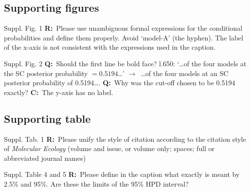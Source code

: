 \documentclass[11pt]{article}
\newenvironment{my_description}
{\begin{description}
  \setlength{\itemsep}{2pt}
  \setlength{\parskip}{0pt}
  \setlength{\parsep}{0pt}}
{\end{description}}
\newcommand{\ra}{$\rightarrow$\ }
\newcommand{\C}{\textbf{C:}\ }
\newcommand{\Q}{\textbf{Q:}\ }
\newcommand{\R}{\textbf{R:}\ }
\begin{document}
\subsection{Supporting figures}

\begin{my_description}
	\item[Suppl. Fig. 1] \R Please use unambiguous formal expressions for the conditional probabilities and define them properly. Avoid `model-A' (the hyphen). The label of the x-axis is not consistent with the expressions used in the caption.
	\item[Suppl. Fig. 2] \Q Should the first line be bold face? l.650: `\dots of the four models at the SC posterior probability $=0.5194$\dots' \ra \dots of the four models at an SC posterior probability of 0.5194\dots. \Q Why was the cut-off chosen to be 0.5194 exactly? \C The y-axis has no label.
\end{my_description}

\subsection{Supporting table}

\begin{my_description}
	\item[Suppl. Tab. 1]  \R Please unify the style of citation according to the citation style of \emph{Molecular Ecology} (volume and issue, or volume only; spaces; full or abbreviated journal names)
	\item[Suppl. Table 4 and 5] \R Please define in the caption what exactly is meant by 2.5\% and 95\%. Are these the limits of the 95\% HPD interval?
\end{my_description}





\end{document}
